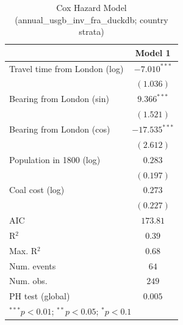 
\begin{table}
\begin{center}
\begin{tabular}{l c}
\hline
 & Model 1 \\
\hline
Travel time from London (log) & $-7.010^{***}$ \\
 & $(1.036)$ \\
Bearing from London (sin) & $9.366^{***}$ \\
 & $(1.521)$ \\
Bearing from London (cos) & $-17.535^{***}$ \\
 & $(2.612)$ \\
Population in 1800 (log) & $0.283$ \\
 & $(0.197)$ \\
Coal cost (log) & $0.273$ \\
 & $(0.227)$ \\
\hline
AIC              & $173.81$ \\
R$^2$            & $0.39$ \\
Max. R$^2$       & $0.68$ \\
Num. events      & $64$ \\
Num. obs.        & $249$ \\
PH test (global) & $0.005$ \\
\hline
\multicolumn{2}{l}{\scriptsize{$^{***}p<0.01$; $^{**}p<0.05$; $^{*}p<0.1$}}
\end{tabular}
\caption{Cox Hazard Model (annual\_usgb\_inv\_fra\_duckdb; country strata)}
\label{tab:cox_serious_strata_annual_usgb_inv_fra_duckdb}
\end{center}
\end{table}
